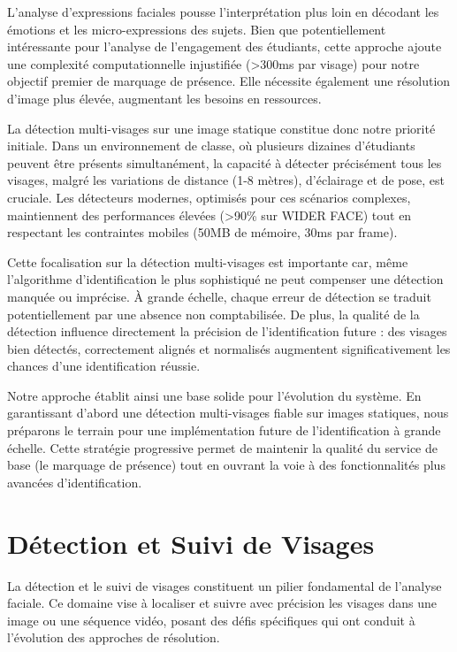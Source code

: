 \begin{onehalfspace}
\hspace{0.65cm}L'analyse d'expressions faciales pousse l'interprétation plus loin en décodant les émotions et les micro-expressions des sujets. Bien que potentiellement intéressante pour l'analyse de l'engagement des étudiants, cette approche ajoute une complexité computationnelle injustifiée (>300ms par visage) pour notre objectif premier de marquage de présence. Elle nécessite également une résolution d'image plus élevée, augmentant les besoins en ressources.

\hspace{0.65cm} La détection multi-visages sur une image statique constitue donc notre priorité initiale. Dans un environnement de classe, où plusieurs dizaines d'étudiants peuvent être présents simultanément, la capacité à détecter précisément tous les visages, malgré les variations de distance (1-8 mètres), d'éclairage et de pose, est cruciale. Les détecteurs modernes, optimisés pour ces scénarios complexes, maintiennent des performances élevées (>90\% sur WIDER FACE) tout en respectant les contraintes mobiles (50MB de mémoire, 30ms par frame).

\hspace{0.65cm} Cette focalisation sur la détection multi-visages est importante car, même l'algorithme d'identification le plus sophistiqué ne peut compenser une détection manquée ou imprécise. À grande échelle, chaque erreur de détection se traduit potentiellement par une absence non comptabilisée. De plus, la qualité de la détection influence directement la précision de l'identification future : des visages bien détectés, correctement alignés et normalisés augmentent significativement les chances d'une identification réussie.

\hspace{0.65cm} Notre approche établit ainsi une base solide pour l'évolution du système. En garantissant d'abord une détection multi-visages fiable sur images statiques, nous préparons le terrain pour une implémentation future de l'identification à grande échelle. Cette stratégie progressive permet de maintenir la qualité du service de base (le marquage de présence) tout en ouvrant la voie à des fonctionnalités plus avancées d'identification.

\section{Détection et Suivi de Visages}
\hspace{0.65cm} La détection et le suivi de visages constituent un pilier fondamental de l'analyse faciale. Ce domaine vise à localiser et suivre avec précision les visages dans une image ou une séquence vidéo, posant des défis spécifiques qui ont conduit à l'évolution des approches de résolution.


\end{onehalfspace}
